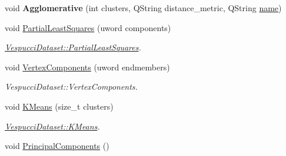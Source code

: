 \begin{DoxyCompactItemize}
\item 
\hypertarget{class_vespucci_dataset_a073243e48a96ed505d24d9d87c2c86e0}{void {\bfseries Agglomerative} (int clusters, Q\+String distance\+\_\+metric, Q\+String \hyperlink{class_vespucci_dataset_ae5b30cb466acfdf741b360bc4f897cc9}{name})}\label{class_vespucci_dataset_a073243e48a96ed505d24d9d87c2c86e0}

\item 
void \hyperlink{class_vespucci_dataset_a044fb21d3fba89b7325ae24eb6042cea}{Partial\+Least\+Squares} (uword components)
\begin{DoxyCompactList}\small\item\em \hyperlink{class_vespucci_dataset_a300693f9bc5b14cbfc9ac710af4b09a1}{Vespucci\+Dataset\+::\+Partial\+Least\+Squares}. \end{DoxyCompactList}\item 
void \hyperlink{class_vespucci_dataset_a74779cef5217e51364427aaed06bf500}{Vertex\+Components} (uword endmembers)
\begin{DoxyCompactList}\small\item\em Vespucci\+Dataset\+::\+Vertex\+Components. \end{DoxyCompactList}\item 
void \hyperlink{class_vespucci_dataset_a738987dbd501063f1fcb6cca7ca9884f}{K\+Means} (size\+\_\+t clusters)
\begin{DoxyCompactList}\small\item\em \hyperlink{class_vespucci_dataset_a66187dec3aeafb655e75d7be5af7f52d}{Vespucci\+Dataset\+::\+K\+Means}. \end{DoxyCompactList}\item 
\hypertarget{class_vespucci_dataset_a5e831b6a048313e1740632d7ab3df52d}{void \hyperlink{class_vespucci_dataset_a5e831b6a048313e1740632d7ab3df52d}{Principal\+Components} ()}\label{class_vespucci_dataset_a5e831b6a048313e1740632d7ab3df52d}


\end{DoxyCompactItemize}

